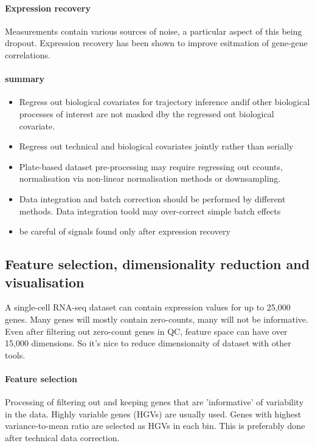 \documentclass[a4paper,12pt]{article}
\begin{document}
\paragraph{Expression recovery}
Measurements contain various sources of noise, a particular aspect of this being dropout. Expression recovery has been shown to improve esitmation of gene-gene correlations.

\paragraph{summary}
\begin{itemize}
\item Regress out biological covariates for trajectory inference andif other biological processes of interest are not masked dby the regressed out biological covariate.
\item Regress out technical and biological covariates jointly rather than serially
\item Plate-based dataset pre-processing may require regressing out ccounts, normalisation via non-linear normalisation methods or downsampling.
\item Data integration and batch correction should be performed by different methods. Data integration toold may over-correct simple batch effects
\item be careful of signals found only after expression recovery
\end{itemize}

\subsection{Feature selection, dimensionality reduction and visualisation}
A single-cell RNA-seq dataset can contain expression values for up to 25,000 genes. Many genes will mostly contain zero-counts, many will not be informative. Even after filtering out zero-count genes in QC, feature space can have over 15,000 dimensions.  So it's nice to reduce dimensionaity of dataset with other tools.

\paragraph{Feature selection}
Processing of filtering out and keeping genes that are 'informative' of variability in the data. Highly variable genes (HGVs) are usually used. Genes with highest variance-to-mean ratio are selected as HGVs in each bin. This is preferably done after technical data correction.
\end{document}

